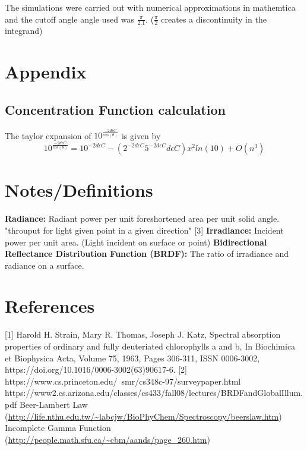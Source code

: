 \documentclass{article}
\begin{document}
The simulations were carried out with numerical approximations in mathemtica and the cutoff angle angle used was $ \frac{\pi}{2.1}$.
($\frac{\pi}{2}$ creates a discontinuity in the integrand)
\section{Appendix}
\subsection{Concentration Function calculation}
The taylor expansion of $ 10^{\frac{-2d\epsilon C}{cos(\theta)}}$ is given by
$$ 10^{\frac{-2d\epsilon C}{ cos(\theta)}} = 10^{-2d\epsilon C} - \left(2^{-2d\epsilon C} 5^{-2d\epsilon C}d\epsilon C\right)x^2ln(10)+O(n^3)$$
\section{Notes/Definitions}

\textbf{Radiance:} Radiant power per unit foreshortened area per unit solid angle. "throuput for light given point in a given direction" [3]
\newline
\textbf{Irradiance:} Incident power per unit area. (Light incident on surface or point)
\newline
\textbf{Bidirectional Reflectance Distribution Function (BRDF):} The ratio of irradiance and radiance on a surface.



\section{References}

[1] Harold H. Strain, Mary R. Thomas, Joseph J. Katz, Spectral absorption properties of ordinary and fully deuteriated chlorophylls a and b,
In Biochimica et Biophysica Acta, Volume 75, 1963, Pages 306-311,
ISSN 0006-3002, https://doi.org/10.1016/0006-3002(63)90617-6. \newline
[2] https://www.cs.princeton.edu/~smr/cs348c-97/surveypaper.html \newline
[3] https://www2.cs.arizona.edu/classes/cs433/fall08/lectures/BRDFandGlobalIllum.pdf
\newline
[4] Beer-Lambert Law (\url{http://life.nthu.edu.tw/~labcjw/BioPhyChem/Spectroscopy/beerslaw.htm}) \newline
[5] Incomplete Gamma Function (\url{http://people.math.sfu.ca/~cbm/aands/page_260.htm})
\end{document}
